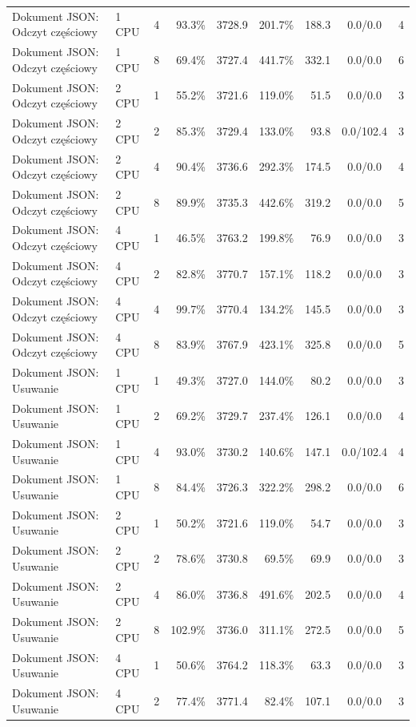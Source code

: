 \begin{table}[ht]
{\begin{tabular}{llcrrrrcc}
Dokument JSON: Odczyt częściowy & 1 CPU & 4 & 93.3\% & 3728.9 & 201.7\% & 188.3 & 0.0/0.0 & 4 \\
Dokument JSON: Odczyt częściowy & 1 CPU & 8 & 69.4\% & 3727.4 & 441.7\% & 332.1 & 0.0/0.0 & 6 \\
Dokument JSON: Odczyt częściowy & 2 CPU & 1 & 55.2\% & 3721.6 & 119.0\% & 51.5 & 0.0/0.0 & 3 \\
Dokument JSON: Odczyt częściowy & 2 CPU & 2 & 85.3\% & 3729.4 & 133.0\% & 93.8 & 0.0/102.4 & 3 \\
Dokument JSON: Odczyt częściowy & 2 CPU & 4 & 90.4\% & 3736.6 & 292.3\% & 174.5 & 0.0/0.0 & 4 \\
Dokument JSON: Odczyt częściowy & 2 CPU & 8 & 89.9\% & 3735.3 & 442.6\% & 319.2 & 0.0/0.0 & 5 \\
Dokument JSON: Odczyt częściowy & 4 CPU & 1 & 46.5\% & 3763.2 & 199.8\% & 76.9 & 0.0/0.0 & 3 \\
Dokument JSON: Odczyt częściowy & 4 CPU & 2 & 82.8\% & 3770.7 & 157.1\% & 118.2 & 0.0/0.0 & 3 \\
Dokument JSON: Odczyt częściowy & 4 CPU & 4 & 99.7\% & 3770.4 & 134.2\% & 145.5 & 0.0/0.0 & 3 \\
Dokument JSON: Odczyt częściowy & 4 CPU & 8 & 83.9\% & 3767.9 & 423.1\% & 325.8 & 0.0/0.0 & 5 \\
Dokument JSON: Usuwanie & 1 CPU & 1 & 49.3\% & 3727.0 & 144.0\% & 80.2 & 0.0/0.0 & 3 \\
Dokument JSON: Usuwanie & 1 CPU & 2 & 69.2\% & 3729.7 & 237.4\% & 126.1 & 0.0/0.0 & 4 \\
Dokument JSON: Usuwanie & 1 CPU & 4 & 93.0\% & 3730.2 & 140.6\% & 147.1 & 0.0/102.4 & 4 \\
Dokument JSON: Usuwanie & 1 CPU & 8 & 84.4\% & 3726.3 & 322.2\% & 298.2 & 0.0/0.0 & 6 \\
Dokument JSON: Usuwanie & 2 CPU & 1 & 50.2\% & 3721.6 & 119.0\% & 54.7 & 0.0/0.0 & 3 \\
Dokument JSON: Usuwanie & 2 CPU & 2 & 78.6\% & 3730.8 & 69.5\% & 69.9 & 0.0/0.0 & 3 \\
Dokument JSON: Usuwanie & 2 CPU & 4 & 86.0\% & 3736.8 & 491.6\% & 202.5 & 0.0/0.0 & 4 \\
Dokument JSON: Usuwanie & 2 CPU & 8 & 102.9\% & 3736.0 & 311.1\% & 272.5 & 0.0/0.0 & 5 \\
Dokument JSON: Usuwanie & 4 CPU & 1 & 50.6\% & 3764.2 & 118.3\% & 63.3 & 0.0/0.0 & 3 \\
Dokument JSON: Usuwanie & 4 CPU & 2 & 77.4\% & 3771.4 & 82.4\% & 107.1 & 0.0/0.0 & 3 \\

\end{tabular}}
\end{table}
